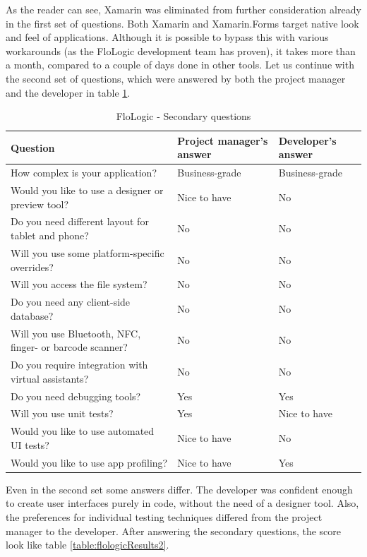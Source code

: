 \documentclass[english,master,public,dept460,male,cpdeclaration,oneside]{diploma}
\begin{document}
As the reader can see, Xamarin was eliminated from further consideration already in the first set of questions. Both Xamarin and Xamarin.Forms target native look and feel of applications. Although it is possible to bypass this with various workarounds (as the FloLogic development team has proven), it takes more than a month, compared to a couple of days done in other tools. 
Let us continue with the second set of questions, which were answered by both the project manager and the developer in table \ref{table:flologicSecondary}.

\begin{table}[!h]
	\centering
	\caption{FloLogic - Secondary questions}
	\label{table:flologicSecondary}
	\begin{tabular}{p{5.5cm} | p{3.5cm} | p{3.5cm}}
		\toprule		
		\textbf{Question} &	\textbf{Project manager’s answer} & \textbf{Developer’s answer} \\
		\midrule
		How complex is your application? & Business-grade & Business-grade \\
		Would you like to use a designer or preview tool? & Nice to have & No \\
		Do you need different layout for tablet and phone? & No & No \\
		Will you use some platform-specific overrides? & No & No \\
		Will you access the file system? & No & No \\
		Do you need any client-side database? & No & No \\
		Will you use Bluetooth, NFC, finger- or barcode scanner? & No & No \\
		Do you require integration with virtual assistants? & No & No \\
		Do you need debugging tools? & Yes & Yes \\
		Will you use unit tests? & Yes & Nice to have \\
		Would you like to use automated UI tests? & Nice to have & No \\
		Would you like to use app profiling? & Nice to have & Yes \\		
		\midrule
	\end{tabular}
\end{table}

Even in the second set some answers differ. The developer was confident enough to create user interfaces purely in code, without the need of a designer tool. Also, the preferences for individual testing techniques differed from the project manager to the developer. After answering the secondary questions, the score look like table \ref{table:flologicResults2}.
\end{document}
